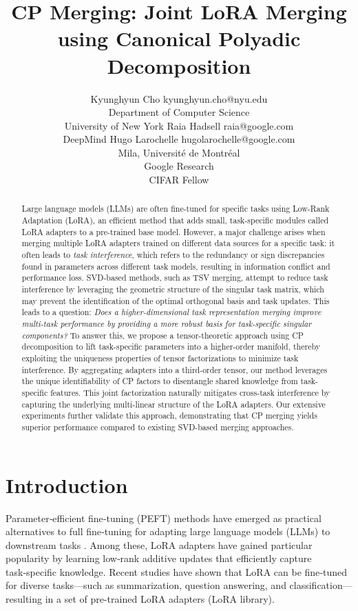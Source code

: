 \documentclass[10pt]{article} %
\title{CP Merging: Joint LoRA Merging using Canonical Polyadic Decomposition}
\author{\name Kyunghyun Cho \email kyunghyun.cho@nyu.edu \\
      \addr Department of Computer Science\\
      University of New York
      \AND
      \name Raia Hadsell \email raia@google.com \\
      \addr DeepMind
      \AND
      \name Hugo Larochelle \email hugolarochelle@google.com\\
      \addr Mila, Universit\'e de Montr\'eal \\
      Google Research\\
      CIFAR Fellow}
\begin{document}
\maketitle

\begin{abstract}

Large language models (LLMs) are often fine-tuned for specific tasks using Low-Rank Adaptation (LoRA), an efficient method that adds small, task-specific modules called LoRA adapters to a pre-trained base model. However, a major challenge arises when merging multiple LoRA adapters trained on different data sources for a specific task: it often leads to \textit{task interference}, which refers to the redundancy or sign discrepancies found in parameters across different task models, resulting in information conflict and performance loss. SVD-based methods, such as TSV merging, attempt to reduce task interference by leveraging the geometric structure of the singular task matrix, which may prevent the identification of the optimal orthogonal basis and task updates.  This leads to a question: \textit{Does a higher-dimensional task representation merging improve multi-task performance by providing a more robust basis for task-specific singular components?} To answer this, we propose a tensor-theoretic approach using CP decomposition to lift task-specific parameters into a higher-order manifold, thereby exploiting the uniqueness properties of tensor factorizations to minimize task interference. By aggregating adapters into a third-order tensor, our method leverages the unique identifiability of CP factors to disentangle shared knowledge from task-specific features. This joint factorization naturally mitigates cross-task interference by capturing the underlying multi-linear structure of the LoRA adapters. Our extensive experiments further validate this approach, demonstrating that CP merging yields superior performance compared to existing SVD-based merging approaches.

\end{abstract}

\section{Introduction}

    Parameter‑efficient fine‑tuning (PEFT) methods have emerged as practical
    alternatives to full fine‑tuning for adapting large language models (LLMs)
    to downstream tasks \citep{hu2021lora,houlsby2019parameter,lester2021power}.
    Among these, LoRA adapters \citep{hu2021lora} have gained particular
    popularity by learning low‑rank additive updates that efficiently capture
    task‑specific knowledge. Recent studies \citep{sheng2023s,ostapenko2024towards,huang2023lorahub}
    have shown that LoRA can be fine‑tuned for diverse tasks—such as
    summarization, question answering, and classification—resulting in a set of pre-trained LoRA adapters (LoRA library).
\end{document}

